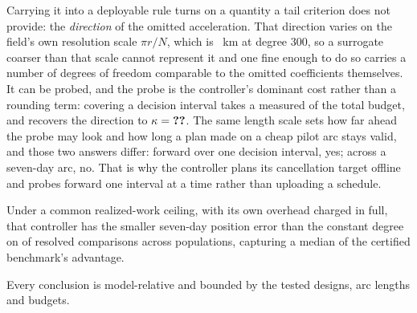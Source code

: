 Carrying it into a deployable rule turns on a quantity a tail criterion does
not provide: the \emph{direction} of the omitted acceleration. That direction
varies on the field's own resolution scale $\pi r/N$, which is ~km at
degree 300, so a surrogate coarser than that scale cannot represent it and one
fine enough to do so carries a number of degrees of freedom comparable to the
omitted coefficients themselves. It can be probed, and the probe is the
controller's dominant cost rather than a rounding term: covering a decision
interval takes a measured  of the total budget, and recovers
the direction to $\kappa=\ph{value}$. The same length scale sets how far ahead
the probe may look and how long a plan made on a cheap pilot arc stays valid,
and those two answers differ: forward over one decision interval, yes; across a
seven-day arc, no. That is why the controller plans its cancellation target
offline and probes forward one interval at a time rather than uploading a
schedule.

Under a common realized-work ceiling, with its own overhead charged in full,
that controller has the smaller seven-day position error than the constant degree on
 of  resolved comparisons across  populations, capturing a
median  of the certified benchmark's advantage.  

Every conclusion is model-relative and bounded by the tested designs, arc
lengths and budgets. 

